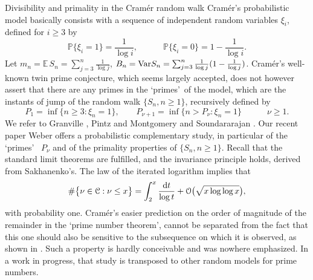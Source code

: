 \documentclass[11pt,draft,reqno]{amsart}
\makeatletter
\def\section{\@startsection{section}{1}%
     \z@{.7\linespacing\@plus\linespacing}{.5\linespacing}%
     {\bfseries%
     \centering
     }}
\theoremstyle{definition}
\theoremstyle{remarks}
\numberwithin{equation}{section}
\def \qq{{\qquad}}
\def \dd{{\rm d}}
\def\P{{\mathcal P}}
\def\E{{\mathbb E \,}}
\def\P{{\mathbb P}}
\makeatother
\begin{document}
\section{Divisibility and primality in the Cram\'er random walk}\label{s9}
Cram\'er's probabilistic model basically consists with  a sequence of independent random variables $\xi_i$, defined for
$i\ge 3$ by
\begin{equation}\label{C.xin}\P\{\xi_i= 1\}= \frac1{\log i}, \qq \quad \P\{\xi_i= 0\}= 1-\frac1{\log i}.
\end{equation}
Let   $m_n=\E S_n=\sum_{j=3}^n \frac1{\log j}$, $B_n={\rm Var }S_n= \sum_{j=3}^n \frac1{\log j}(1-\frac1{\log j})$. 
Cram\'er's well-known twin prime conjecture, which seems largely accepted,   does not however assert that there are any primes in  the \lq primes\rq\,  of the model,  which are  the instants  of jump   
of the random walk  $\{S_n , n\ge 1\}$,  recursively defined  by 
  \begin{equation}\label{C.Pn} P_1= \inf\{ n\ge 3: \xi_n=1\},\qq   P_{\nu +1} =\inf\{ n>P_\nu: \xi_n=1\}  \qq \quad \nu\ge 1  .
\end{equation}
 We refer   to Granville \cite{G},   Pintz \cite{P}  and Montgomery and Soundararajan \cite{MS}.    Our recent paper Weber \cite{W8} offers a     probabilistic complementary study, in particular     of   the \lq primes\rq~ $P_\nu$      and of the primality properties of  $\{S_n, n\ge 1\}$.
Recall    
that  the standard limit theorems
are fulfilled,  
   and  the    invariance principle   holds, derived from Sakhanenko's. The law of the iterated logarithm implies that 
\begin{equation}\label{cramer.pnt}
 \#\big\{ \nu\in \mathcal C : \nu\le x\big\} = \int_2^x \frac{\dd t}{\log t} + \mathcal O\big( \sqrt{x\log\log x}\big) ,
\end{equation}
with probability one.          Cram\'er's  easier prediction on  the order of magnitude of the remainder   in the \lq   prime number theorem\rq, cannot be separated from the fact that this one should  also be sensitive to the subsequence on which it is observed, as    shown  in \cite{W8}. Such a property  is hardly conceivable  and was nowhere emphasized.  
 In a work in progress, that  study is  transposed to other random models for  prime numbers. 
\end{document}
